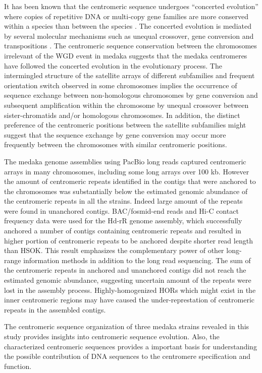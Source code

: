 It has been known that the centromeric sequence undergoes ``concerted evolution'' where copies of repetitive DNA or multi-copy gene families are more conserved within a species than between the species \cite{Dover1982, Willard1991, Charlesworth1994}. The concerted evolution is mediated by several molecular mechanisms such as unequal crossover, gene conversion and transpositions \cite{Dover1982}. The centromeric sequence conservation between the chromosomes irrelevant of the WGD event in medaka suggests that the medaka centromeres have followed the concerted evolution in the evolutionary process. The intermingled structure of the satellite arrays of different subfamilies and frequent orientation switch observed in some chromosomes implies the occurrence of sequence exchange between non-homologous chromosomes by gene conversion and subsequent amplification within the chromosome by unequal crossover between sister-chromatids and/or homologous chromosomes. In addition, the distinct preference of the centromeric positions between the satellite subfamilies might suggest that the sequence exchange by gene conversion may occur more frequently between the chromosomes with similar centromeric positions.

The medaka genome assemblies using PacBio long reads captured centromeric arrays in many chromosomes, including some long arrays over 100 kb. However the amount of centromeric repeats identified in the contigs that were anchored to the chromosomes was substantially below the estimated genomic abundance of the centromeric repeats in all the strains. Indeed large amount of the repeats were found in unanchored contigs. BAC/fosmid-end reads and Hi-C contact frequency data were used for the Hd-rR genome assembly, which successfully anchored a number of contigs containing centromeric repeats and resulted in higher portion of centromeric repeats to be anchored despite shorter read length than HSOK. This result emphasizes the complementary power of other long-range information methods in addition to the long read sequencing. The sum of the centromeric repeats in anchored and unanchored contigs did not reach the estimated genomic abundance, suggesting uncertain amount of the repeats were lost in the assembly process. Highly-homogenized HORs which might exist in the inner centromeric regions may have caused the under-represtation of centromeric repeats in the assembled contigs.

The centromeric sequence organization of three medaka strains revealed in this study provides insights into centromeric sequence evolution. Also, the characterized centromeric sequences provides a important basis for understanding the possible contribution of DNA sequences to the centromere specification and function.
